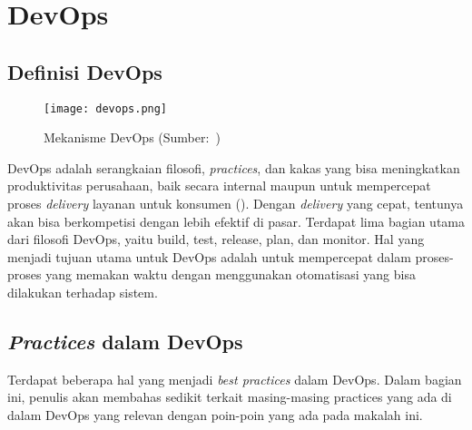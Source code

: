 \section{DevOps}

\subsection{Definisi DevOps}
\begin{figure}[h]
  \centering
  \texttt{[image: devops.png]}
  \caption{Mekanisme DevOps (Sumber:~\cite{devops})}
\end{figure}
DevOps adalah serangkaian filosofi, \textit{practices}, dan kakas yang bisa meningkatkan produktivitas perusahaan, baik secara internal maupun untuk mempercepat proses \textit{delivery} layanan untuk konsumen (\cite{devops}).
Dengan \textit{delivery} yang cepat, tentunya akan bisa berkompetisi dengan lebih efektif di pasar.
Terdapat lima bagian utama dari filosofi DevOps, yaitu build, test, release, plan, dan monitor.
Hal yang menjadi tujuan utama untuk DevOps adalah untuk mempercepat dalam proses-proses yang memakan waktu dengan menggunakan otomatisasi yang bisa dilakukan terhadap sistem.

\subsection{\textit{Practices} dalam DevOps}
Terdapat beberapa hal yang menjadi \textit{best practices} dalam DevOps. 
Dalam bagian ini, penulis akan membahas sedikit terkait masing-masing practices yang ada di dalam DevOps yang relevan dengan poin-poin yang ada pada makalah ini.


